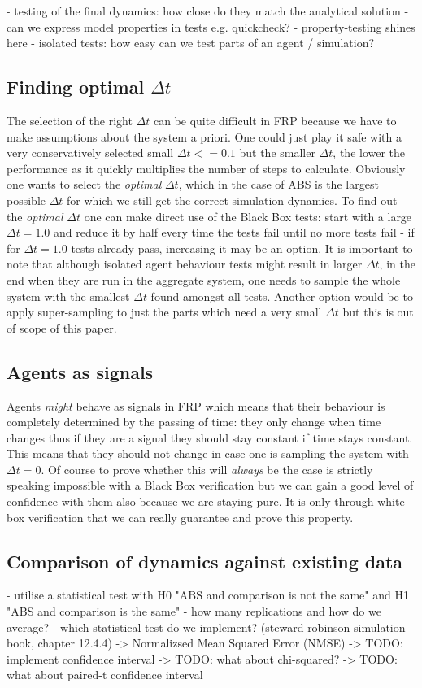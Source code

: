 - testing of the final dynamics: how close do they match the analytical solution
- can we express model properties in tests e.g. quickcheck?
- property-testing shines here
- isolated tests: how easy can we test parts of an agent / simulation?

\subsection{Finding optimal $\Delta t$}
The selection of the right $\Delta t$ can be quite difficult in FRP because we have to make assumptions about the system a priori. One could just play it safe with a very conservatively selected small $\Delta t <= 0.1$ but the smaller $\Delta t$, the lower the performance as it quickly multiplies the number of steps to calculate. Obviously one wants to select the \textit{optimal} $\Delta t$, which in the case of ABS is the largest possible $\Delta t$ for which we still get the correct simulation dynamics.
To find out the \textit{optimal} $\Delta t$ one can make direct use of the Black Box tests: start with a large $\Delta t = 1.0$ and reduce it by half every time the tests fail until no more tests fail - if for $\Delta t = 1.0$ tests already pass, increasing it may be an option. It is important to note that although isolated agent behaviour tests might result in larger $\Delta t$, in the end when they are run in the aggregate system, one needs to sample the whole system with the smallest $\Delta t$ found amongst all tests. Another option would be to apply super-sampling to just the parts which need a very small $\Delta t$ but this is out of scope of this paper.

\subsection{Agents as signals}
Agents \textit{might} behave as signals in FRP which means that their behaviour is completely determined by the passing of time: they only change when time changes thus if they are a signal they should stay constant if time stays constant. This means that they should not change in case one is sampling the system with $\Delta t = 0$. Of course to prove whether this will \textit{always} be the case is strictly speaking impossible with a Black Box verification but we can gain a good level of confidence with them also because we are staying pure. It is only through white box verification that we can really guarantee and prove this property.

\subsection{Comparison of dynamics against existing data}
- utilise a statistical test with H0 "ABS and comparison is not the same" and H1 "ABS and comparison is the same"
- how many replications and how do we average?
- which statistical test do we implement? (steward robinson simulation book, chapter 12.4.4)
	-> Normalizsed Mean Squared Error (NMSE)
	-> TODO: implement confidence interval 
	-> TODO: what about chi-squared?
	-> TODO: what about paired-t confidence interval

